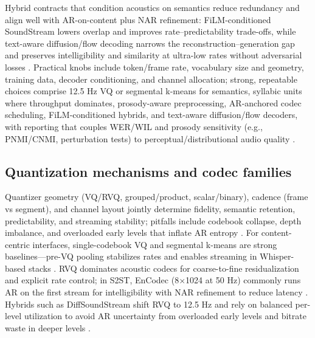 \documentclass{article}
\begin{document}
Hybrid contracts that condition acoustics on semantics reduce redundancy and align well with AR-on-content plus NAR refinement: FiLM-conditioned SoundStream lowers overlap and improves rate--predictability trade-offs, while text-aware diffusion/flow decoding narrows the reconstruction--generation gap and preserves intelligibility and similarity at ultra-low rates without adversarial losses \cite{yang2025diffsoundstreamefficientspeechtokenizati,peng2024mslms2stmultitaskspeechlanguagemodeltext,wang2025tadicodectextawarediffusionspeechtokeniz}. Practical knobs include token/frame rate, vocabulary size and geometry, training data, decoder conditioning, and channel allocation; strong, repeatable choices comprise 12.5 Hz VQ or segmental k-means for semantics, syllabic units where throughput dominates, prosody-aware preprocessing, AR-anchored codec scheduling, FiLM-conditioned hybrids, and text-aware diffusion/flow decoders, with reporting that couples WER/WIL and prosody sensitivity (e.g., PNMI/CNMI, perturbation tests) to perceptual/distributional audio quality \cite{zeng2024scalingspeechtextpretrainingsyntheticint,kando2025exploringeffectsegmentationvocabularysiz,baade2024syllablelmlearningcoarsesemanticunitsspe,onda2025benchmarkingprosodyencodingdiscretespeec,li2024investigatingneuralaudiocodecsspeechlang,yang2025diffsoundstreamefficientspeechtokenizati,wang2025tadicodectextawarediffusionspeechtokeniz,guo2025recentadvancesdiscretespeechtokensreview}.

\subsection{Quantization mechanisms and codec families} \label{subsec:Quantization mechanisms and codec families}
Quantizer geometry (VQ/RVQ, grouped/product, scalar/binary), cadence (frame vs segment), and channel layout jointly determine fidelity, semantic retention, predictability, and streaming stability; pitfalls include codebook collapse, depth imbalance, and overloaded early levels that inflate AR entropy \cite{zeng2024scalingspeechtextpretrainingsyntheticint}. For content-centric interfaces, single-codebook VQ and segmental k-means are strong baselines---pre-VQ pooling stabilizes rates and enables streaming in Whisper-based stacks \cite{baade2024syllablelmlearningcoarsesemanticunitsspe,zeng2024scalingspeechtextpretrainingsyntheticint}. RVQ dominates acoustic codecs for coarse-to-fine residualization and explicit rate control; in S2ST, EnCodec (8$\times$1024 at 50 Hz) commonly runs AR on the first stream for intelligibility with NAR refinement to reduce latency \cite{peng2024mslms2stmultitaskspeechlanguagemodeltext}. Hybrids such as DiffSoundStream shift RVQ to 12.5 Hz and rely on balanced per-level utilization to avoid AR uncertainty from overloaded early levels and bitrate waste in deeper levels \cite{yang2025diffsoundstreamefficientspeechtokenizati}.
\end{document}
